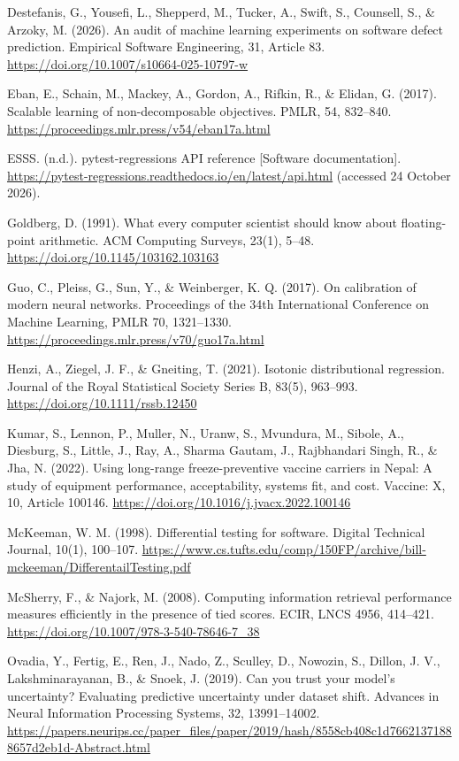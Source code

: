 \documentclass[11pt,a4paper]{article}
\begin{document}
Destefanis, G., Yousefi, L., Shepperd, M., Tucker, A., Swift, S., Counsell, S., \& Arzoky, M. (2026). An audit of machine learning experiments on software defect prediction. Empirical Software Engineering, 31, Article 83. \url{https://doi.org/10.1007/s10664-025-10797-w}

Eban, E., Schain, M., Mackey, A., Gordon, A., Rifkin, R., \& Elidan, G. (2017). Scalable learning of non-decomposable objectives. PMLR, 54, 832--840. \url{https://proceedings.mlr.press/v54/eban17a.html}

ESSS. (n.d.). pytest-regressions API reference [Software documentation]. \url{https://pytest-regressions.readthedocs.io/en/latest/api.html} (accessed 24 October 2026).

Goldberg, D. (1991). What every computer scientist should know about floating-point arithmetic. ACM Computing Surveys, 23(1), 5--48. \url{https://doi.org/10.1145/103162.103163}

Guo, C., Pleiss, G., Sun, Y., \& Weinberger, K. Q. (2017). On calibration of modern neural networks. Proceedings of the 34th International Conference on Machine Learning, PMLR 70, 1321--1330. \url{https://proceedings.mlr.press/v70/guo17a.html}

Henzi, A., Ziegel, J. F., \& Gneiting, T. (2021). Isotonic distributional regression. Journal of the Royal Statistical Society Series B, 83(5), 963--993. \url{https://doi.org/10.1111/rssb.12450}

Kumar, S., Lennon, P., Muller, N., Uranw, S., Mvundura, M., Sibole, A., Diesburg, S., Little, J., Ray, A., Sharma Gautam, J., Rajbhandari Singh, R., \& Jha, N. (2022). Using long-range freeze-preventive vaccine carriers in Nepal: A study of equipment performance, acceptability, systems fit, and cost. Vaccine: X, 10, Article 100146. \url{https://doi.org/10.1016/j.jvacx.2022.100146}

McKeeman, W. M. (1998). Differential testing for software. Digital Technical Journal, 10(1), 100--107. \url{https://www.cs.tufts.edu/comp/150FP/archive/bill-mckeeman/DifferentailTesting.pdf}

McSherry, F., \& Najork, M. (2008). Computing information retrieval performance measures efficiently in the presence of tied scores. ECIR, LNCS 4956, 414--421. \url{https://doi.org/10.1007/978-3-540-78646-7_38}

Ovadia, Y., Fertig, E., Ren, J., Nado, Z., Sculley, D., Nowozin, S., Dillon, J. V., Lakshminarayanan, B., \& Snoek, J. (2019). Can you trust your model's uncertainty? Evaluating predictive uncertainty under dataset shift. Advances in Neural Information Processing Systems, 32, 13991--14002. \url{https://papers.neurips.cc/paper_files/paper/2019/hash/8558cb408c1d76621371888657d2eb1d-Abstract.html}
\end{document}
